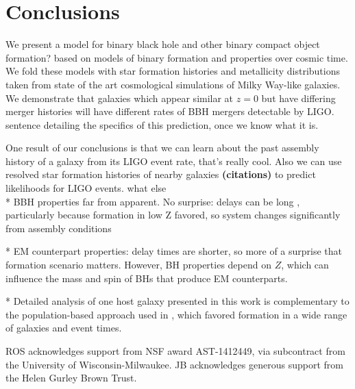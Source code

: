 \documentclass[nofootinbib,twocolumn,prd]{emulateapj}
\newcommand\jillianremark[1]{{\color{blue}#1}}
\begin{document}
\section{Conclusions}

We present a model for binary black hole \jillianremark {and other binary compact object formation?} based on models of binary formation and properties over cosmic time.  We fold these models with star formation histories and metallicity distributions taken from state of the art cosmological simulations of Milky Way-like galaxies.  We demonstrate that galaxies which appear similar at $z = 0$ but have differing merger histories will have different rates of BBH mergers detectable by LIGO.  \jillianremark{sentence detailing the specifics of this prediction, once we know what it is.}   

One result of our conclusions is that we can learn about the past assembly history of a galaxy from its LIGO event rate, \jillianremark{ that's really cool.  }  Also we can use resolved star formation histories of nearby galaxies {\bf (citations)} to predict likelihoods for LIGO events.  \jillianremark { what else}\\


* BBH properties far from apparent.  No surprise: delays can be long \cite{PSellipticals,popsyn-LowMetallicityImpact2b-StarTrackRevised-2013,gwastro-EventPopsynPaper-2016}, particularly because formation in low Z favored,
so system changes significantly from assembly conditions

* EM counterpart properties: delay times are shorter, so more of a surprise that formation scenario matters.  However,
BH properties depend on $Z$, which can influence the mass and spin of BHs that produce EM counterparts.



* Detailed analysis of one host galaxy presented in this work is complementary to the population-based approach used in
\cite{2016arXiv160508783L}, which favored formation in a wide range of galaxies and event times.   %




\begin{acknowledgements}
ROS acknowledges support from NSF award AST-1412449, via subcontract from the University of Wisconsin-Milwaukee.
%
JB acknowledges generous support  from the Helen Gurley Brown Trust.
\end{acknowledgements}

\appendix







\end{document}
